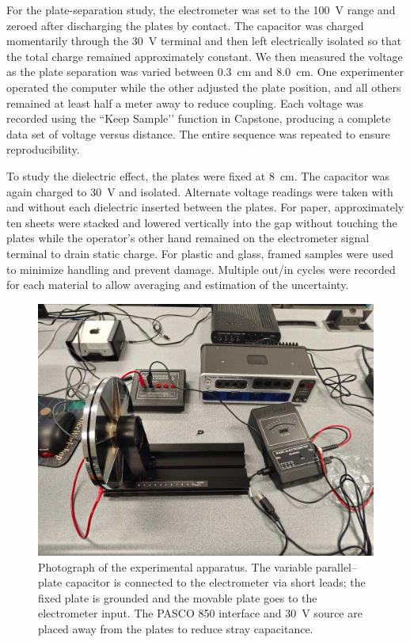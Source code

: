 \documentclass[12pt]{article}
\begin{document}
For the plate-separation study, the electrometer was set to the \SI{100}{V} range and zeroed after discharging the plates by contact.  The capacitor was charged momentarily through the \SI{+30}{V} terminal and then left electrically isolated so that the total charge remained approximately constant.  We then measured the voltage as the plate separation was varied between \SI{0.3}{cm} and \SI{8.0}{cm}.  One experimenter operated the computer while the other adjusted the plate position, and all others remained at least half a meter away to reduce coupling.  Each voltage was recorded using the “Keep Sample’’ function in Capstone, producing a complete data set of voltage versus distance.  The entire sequence was repeated to ensure reproducibility.

To study the dielectric effect, the plates were fixed at \SI{8}{cm}.  The capacitor was again charged to \SI{30}{V} and isolated.  Alternate voltage readings were taken with and without each dielectric inserted between the plates.  For paper, approximately ten sheets were stacked and lowered vertically into the gap without touching the plates while the operator’s other hand remained on the electrometer signal terminal to drain static charge.  For plastic and glass, framed samples were used to minimize handling and prevent damage.  Multiple out/in cycles were recorded for each material to allow averaging and estimation of the uncertainty.
\begin{figure}[htbp]
  \centering
  \includegraphics[width=0.9\linewidth]{1.jpg}
  \caption{Photograph of the experimental apparatus. The variable parallel–plate capacitor is connected to the electrometer via short leads; the fixed plate is grounded and the movable plate goes to the electrometer input. The PASCO 850 interface and \SI{30}{V} source are placed away from the plates to reduce stray capacitance.}
  \label{fig:apparatus}
\end{figure}
\end{document}
